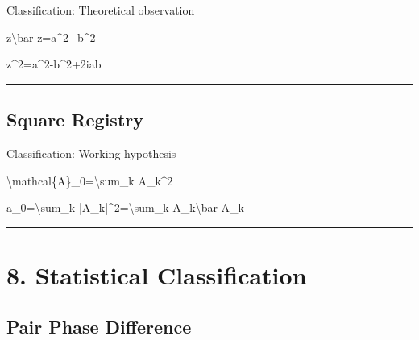 \documentclass[
  a4paper,
]{article}
\newenvironment{Shaded}{}{}
\newcommand{\NormalTok}[1]{#1}
\begin{document}
Classification: Theoretical observation

\begin{Shaded}
\begin{Highlighting}[]
\NormalTok{z\textbackslash{}bar z=a\^{}2+b\^{}2}
\end{Highlighting}
\end{Shaded}

\begin{Shaded}
\begin{Highlighting}[]
\NormalTok{z\^{}2=a\^{}2{-}b\^{}2+2iab}
\end{Highlighting}
\end{Shaded}

\begin{center}\rule{0.5\linewidth}{0.5pt}\end{center}

\subsection{Square Registry}\label{square-registry}

Classification: Working hypothesis

\begin{Shaded}
\begin{Highlighting}[]
\NormalTok{\textbackslash{}mathcal\{A\}\_0=\textbackslash{}sum\_k A\_k\^{}2}
\end{Highlighting}
\end{Shaded}

\begin{Shaded}
\begin{Highlighting}[]
\NormalTok{a\_0=\textbackslash{}sum\_k |A\_k|\^{}2=\textbackslash{}sum\_k A\_k\textbackslash{}bar A\_k}
\end{Highlighting}
\end{Shaded}

\begin{center}\rule{0.5\linewidth}{0.5pt}\end{center}

\section{8. Statistical
Classification}\label{statistical-classification}

\subsection{Pair Phase Difference}\label{pair-phase-difference}
\end{document}
